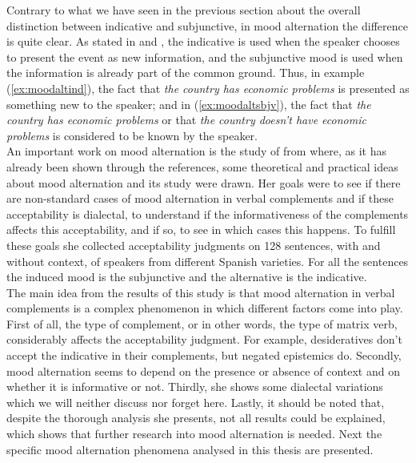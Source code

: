 Contrary to what we have seen in the previous section about the overall distinction between indicative and subjunctive, in mood alternation the difference is quite clear. As stated in \citet{mejias1998pragmatic,espanola2010nueva} and \citet{falk2017towards}, the indicative is used when the speaker chooses to present the event as new information, and the subjunctive mood is used when the information is already part of the common ground. Thus, in example (\ref{ex:moodaltind}), the fact that \textit{the country has economic problems} is presented as something new to the speaker; and in (\ref{ex:moodaltsbjv}), the fact that \textit{the country has economic problems} or that \textit{the country doesn't have economic problems} is considered to be known by the speaker.\\

An important work on mood alternation is the study of \citet{faulkner2021systematic} from where, as it has already been shown through the references, some theoretical and practical ideas about mood alternation and its study were drawn. Her goals were to see if there are non-standard cases of mood alternation in verbal complements and if these acceptability is dialectal, to understand if the informativeness of the complements affects this acceptability, and if so, to see in which cases this happens. To fulfill these goals she collected acceptability judgments on 128 sentences, with and without context, of speakers from different Spanish varieties. For all the sentences the induced mood is the subjunctive and the alternative is the indicative.\\

The main idea from the results of this study is that mood alternation in verbal complements is a complex phenomenon in which different factors come into play. First of all, the type of complement, or in other words, the type of matrix verb, considerably affects the acceptability judgment. For example, desideratives don't accept the indicative in their complements, but negated epistemics do. Secondly, mood alternation seems to depend on the presence or absence of context and on whether it is informative or not. Thirdly, she shows some dialectal variations which we will neither discuss nor forget here. Lastly, it should be noted that, despite the thorough analysis she presents, not all results could be explained, which shows that further research into mood alternation is needed. Next the specific mood alternation phenomena analysed in this thesis are presented.\\

